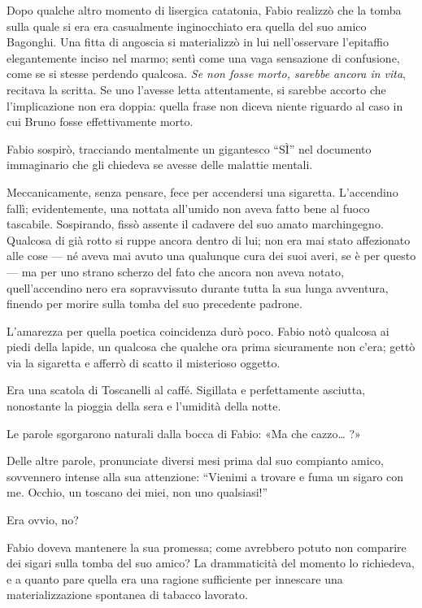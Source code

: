 Dopo qualche altro momento di lisergica catatonia, Fabio realizzò che la
tomba sulla quale si era era casualmente inginocchiato era quella del
suo amico Bagonghi. Una fitta di angoscia si materializzò in lui
nell'osservare l'epitaffio elegantemente inciso nel marmo; sentì come
una vaga sensazione di confusione, come se si stesse perdendo qualcosa.
\emph{Se non fosse morto, sarebbe ancora in vita}, recitava la scritta.
Se uno l'avesse letta attentamente, si sarebbe accorto che
l'implicazione non era doppia: quella frase non diceva niente riguardo
al caso in cui Bruno fosse effettivamente morto.

Fabio sospirò, tracciando mentalmente un gigantesco ``SÌ'' nel documento
immaginario che gli chiedeva se avesse delle malattie mentali.

Meccanicamente, senza pensare, fece per accendersi una sigaretta.
L'accendino fallì; evidentemente, una nottata all'umido non aveva fatto
bene al fuoco tascabile. Sospirando, fissò assente il cadavere del suo
amato marchingegno. Qualcosa di già rotto si ruppe ancora dentro di lui;
non era mai stato affezionato alle cose --- né aveva mai avuto una
qualunque cura dei suoi averi, se è per questo --- ma per uno strano
scherzo del fato che ancora non aveva notato, quell'accendino nero era
sopravvissuto durante tutta la sua lunga avventura, finendo per morire
sulla tomba del suo precedente padrone.

L'amarezza per quella poetica coincidenza durò poco. Fabio notò qualcosa
ai piedi della lapide, un qualcosa che qualche ora prima sicuramente non
c'era; gettò via la sigaretta e afferrò di scatto il misterioso oggetto.

Era una scatola di Toscanelli al caffé. Sigillata e perfettamente
asciutta, nonostante la pioggia della sera e l'umidità della notte.

Le parole sgorgarono naturali dalla bocca di Fabio: «Ma che
cazzo\ldots{} ?»

Delle altre parole, pronunciate diversi mesi prima dal suo compianto
amico, sovvennero intense alla sua attenzione: ``Vienimi a trovare e
fuma un sigaro con me. Occhio, un toscano dei miei, non uno qualsiasi!''

Era ovvio, no?

Fabio doveva mantenere la sua promessa; come avrebbero potuto non
comparire dei sigari sulla tomba del suo amico? La drammaticità del
momento lo richiedeva, e a quanto pare quella era una ragione
sufficiente per innescare una materializzazione spontanea di tabacco
lavorato.

